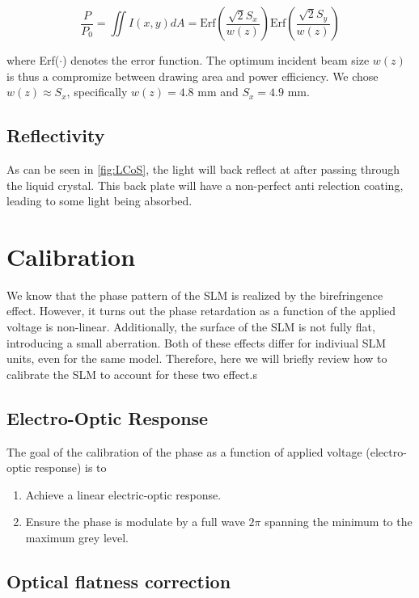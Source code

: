 \begin{equation}\label{RectAperturePower}
    \frac{P}{P_0} =
    \iint I(x,y) dA=
    \text{Erf}\left(\frac{\sqrt{2}S_x}{w(z)}\right) \text{Erf}\left(\frac{\sqrt{2}S_y}{w(z)}\right)
\end{equation}

where Erf($\cdot$) denotes the error function. The optimum incident beam size $w(z)$ is thus a compromize between drawing area and power efficiency. We chose $w(z) \approx S_{x}$, specifically $w(z) = 4.8$ mm and $S_x = 4.9$ mm. 

\subsection{Reflectivity}

As can be seen in \cref{fig:LCoS}, the light will back reflect at after passing through the liquid crystal. This back plate will have a non-perfect anti relection coating, leading to some light being absorbed. 


\section{Calibration}

We know that the phase pattern of the SLM is realized by the birefringence effect. However, it turns out the phase retardation as a function of the applied voltage is non-linear. Additionally, the surface of the SLM is not fully flat, introducing a small aberration. Both of these effects differ for indiviual SLM units, even for the same model. Therefore, here we will briefly review how to calibrate the SLM to account for these two effect.s 

\subsection{Electro-Optic Response}

The goal of the calibration of the phase as a function of applied voltage (electro-optic response) is to 

\begin{enumerate}
    \item Achieve a linear electric-optic response. 
    \item Ensure the phase is modulate by a full wave $2\pi$ spanning the minimum to the maximum grey level. 
\end{enumerate}

\subsection{Optical flatness correction}

